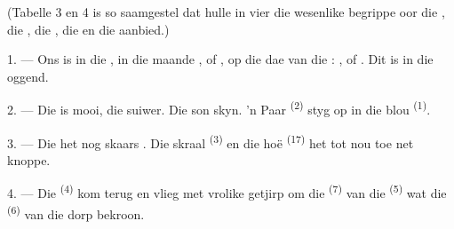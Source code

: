 %
%
%

\VUsaut{3.0mm}
\VUsaut{1.6mm}
\VUsaut{3.4mm}

(Tabelle 3 en 4 is so saamgestel dat hulle in vier  die wesenlike
begrippe oor die , die , die , die
 en die  aanbied.)
\VUsaut{4.0mm}

\VUsaut{3.0mm}

\VUsaut{2.4mm}

\VUsaut{3.0mm}

1. --- Ons is in die , in die maande ,  of
, op die dae van die : ,  of
. Dit is  in die oggend.

2. --- Die  is mooi, die  suiwer. Die son skyn. 'n Paar
 \textsuperscript{(2)} styg op in die blou 
\textsuperscript{(1)}.

3. --- Die  het nog skaars . Die skraal 
\textsuperscript{(3)} en die hoë  \textsuperscript{(17)} het tot nou toe
net knoppe.

4. --- Die  \textsuperscript{(4)} kom terug en vlieg met vrolike
getjirp om die  \textsuperscript{(7)} van die 
\textsuperscript{(5)} wat die  \textsuperscript{(6)} van die dorp bekroon.

